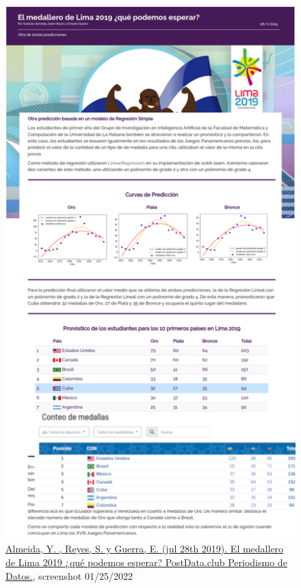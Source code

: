 \documentclass{article}
\begin{document}
\begin{figure}[h]
    \centering
    \includegraphics[height=0.8\textheight]{images/panamerican.png}
    \caption{\href{http://www.postdata.club/issues/201907/el-medallero-de-lima-2019-que-se-puede-esperar.html}{Almeida, Y. , Reyes, S. y Guerra, E. (jul 28th 2019). El medallero de Lima 2019 ¿qué podemos esperar? PostData.club Periodismo de Datos.}, screenshot 01/25/2022}
    \label{sec:panamerican}
\end{figure}
\end{document}
